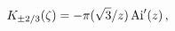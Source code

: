 \[\mathop{K_{\pm 2/3}\/}\nolimits\!\left(\zeta\right)=-\pi(\sqrt{3}/z)\mathop{%
\mathrm{Ai}\/}\nolimits'\!\left(z\right),\]